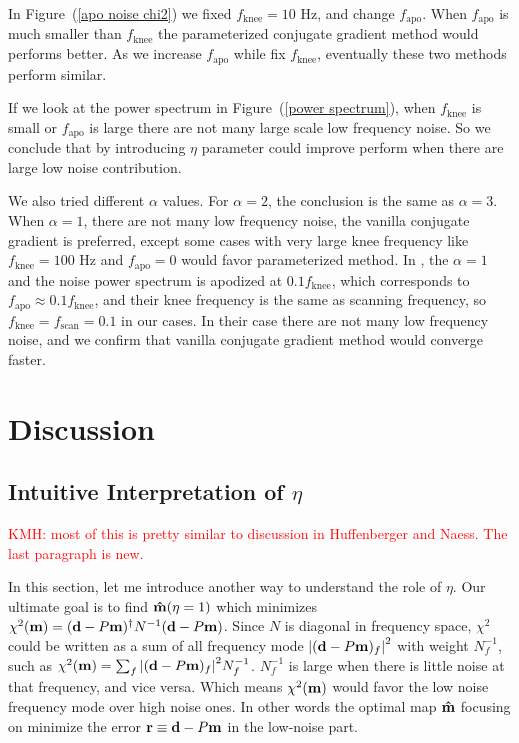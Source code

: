 \documentclass[twocolumn,linenumbers]{aastex631}
\newcommand{\vbd}{\vb{d}}
\newcommand{\vbm}{\vb{m}}
\newcommand{\inv}[1]{#1^{-1}}
\newcommand{\hatm}{\vb{\hat{m}}}
\newcommand{\kmh}[1]{\textcolor{red}{KMH: #1}}
\begin{document}
In Figure~(\ref{apo noise chi2}) we fixed $f_\text{knee}=10$ Hz, and change $f_\text{apo}$.
When $f_\text{apo}$ is much smaller than $f_\text{knee}$ the parameterized conjugate gradient method would
performs better.
As we increase $f_\text{apo}$ while fix $f_\text{knee}$, eventually these two methods perform similar.

If we look at the power spectrum in Figure~(\ref{power spectrum}),
when $f_\text{knee}$ is small or $f_\text{apo}$ is large there are not many
large scale low frequency noise.
So we conclude that by introducing $\eta$ parameter could improve perform when there are large low noise
contribution.


We also tried different $\alpha$ values. For $\alpha=2$, the conclusion is the
same as $\alpha=3$. When $\alpha=1$, there are not many low frequency noise, 
the vanilla conjugate gradient is preferred, except some cases with very large
knee frequency like $f_\text{knee} = 100$ Hz and $f_\text{apo}=0$ would favor
parameterized method.
In \citealt{2018A&A...620A..59P}, the $\alpha = 1$ and  the noise power spectrum is apodized at $0.1f_\text{knee}$,
which corresponds to $f_\text{apo} \approx 0.1 f_\text{knee}$,
and their knee frequency is the same as scanning frequency, so $f_\text{knee}=f_\text{scan}=0.1$ 
in our cases.
In their case there are not many low frequency noise,
and we confirm that vanilla conjugate gradient method would converge faster.



\section{Discussion} \label{sec:discussion}

\subsection{Intuitive Interpretation of $\eta$}\label{intuitive interp}

\kmh{most of this is pretty similar to discussion in Huffenberger and Naess.  The last paragraph is new.}

In this section, let me introduce another way to understand the role of $\eta$.
Our ultimate goal is to find $\hatm(\eta=1)$ which minimizes 
$\chi^2(\vbm) = (\vbd - P\vbm)^{\dagger} \inv{N} (\vbd - P\vbm)$.
Since $N$ is diagonal in frequency space,
$\chi^2$ could be written as a sum of all frequency mode 
$\qty|(\vbd-P\vbm)_f|^2$ with weight $\inv{N}_f$, such as
$\chi^2(\vbm) = \sum_f \qty|(\vbd-P\vbm)_f|^2 \inv{N}_f$.
$\inv{N}_f$ is large when there is little noise at that frequency,
and vice versa.
Which means $\chi^2(\vbm)$ would favor the low noise frequency mode over high 
noise ones.
In other words the optimal map $\hatm$ focusing on minimize the error
$\vb{r} \equiv \vbd - P\vbm$ in the low-noise part.
\end{document}
